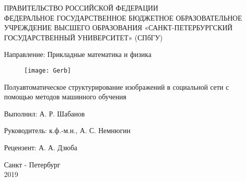 \begin{titlepage}
		
\thispagestyle{empty}
		
  \begin{center}
  
   \large
   ПРАВИТЕЛЬСТВО РОССИЙСКОЙ ФЕДЕРАЦИИ \\
   
   \vspace{0.25cm}
   ФЕДЕРАЛЬНОЕ ГОСУДАРСТВЕННОЕ БЮДЖЕТНОЕ
   ОБРАЗОВАТЕЛЬНОЕ УЧРЕЖДЕНИЕ ВЫСШЕГО ОБРАЗОВАНИЯ 
   «САНКТ-ПЕТЕРБУРГСКИЙ ГОСУДАРСТВЕННЫЙ УНИВЕРСИТЕТ» 
   (СПбГУ)
   
   \vspace{0.25cm}
   Направление: Прикладные математика и физика
   
 
   \begin{figure}[h!]
   	\begin{center}
   		\texttt{[image: Gerb]}
   	\end{center}
   \end{figure}


    {\LARGE Полуавтоматическое структурирование изображений в социальной сети с помощью методов машинного обучения}
 \bigskip

\vfill

\begin{flushright}
    Выполнил: А. Р. Шабанов
    
    Руководитель: к.ф.-м.н., А. С. Немнюгин
    
    Рецензент: А. А. Дзюба
\end{flushright}

\end{center}

\vfill

\newlength{\ML}


\begin{center}
    Санкт - Петербург \\
    2019
\end{center}

\end{titlepage}
